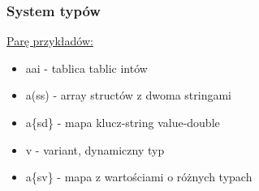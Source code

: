 \begin{frame}
    \frametitle{System typów}
    \href{https://dbus.freedesktop.org/doc/dbus-specification.html}{Parę przykładów:}
    \begin{itemize}
        \item aai - tablica tablic intów
        \item a(ss) - array structów z dwoma stringami
        \item a\{sd\} - mapa klucz-string value-double
        \item v - variant, dynamiczny typ
        \item a\{sv\} - mapa z wartościami o różnych typach
    \end{itemize}
\end{frame}





